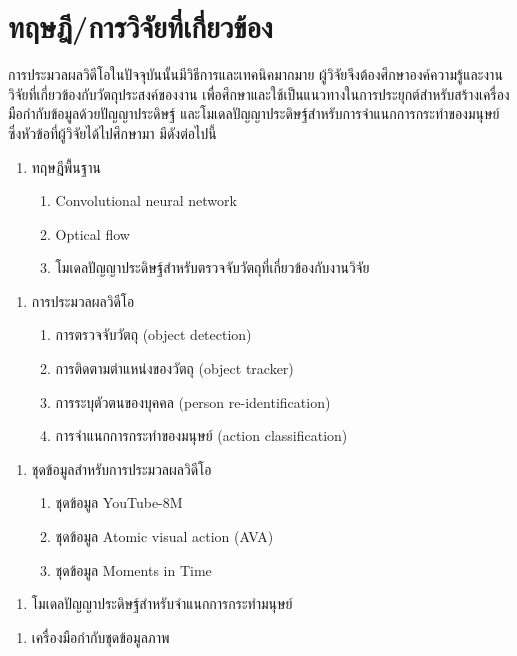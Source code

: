 \clearpage
\chapter{ทฤษฎี/การวิจัยที่เกี่ยวข้อง}
การประมวลผลวิดีโอในปัจจุบันนั้นมีวิธีการและเทคนิคมากมาย ผู้วิจัยจึงต้องศึกษาองค์ความรู้และงานวิจัยที่เกี่ยวข้องกับวัตถุประสงค์ของงาน 
เพื่อศึกษาและใช้เป็นแนวทางในการประยุกต์สำหรับสร้างเครื่องมือกำกับข้อมูลด้วยปัญญาประดิษฐ์ และโมเดลปัญญาประดิษฐ์สำหรับการจำแนกการกระทำของมนุษย์ 
ซึ่งหัวข้อที่ผู้วิจัยได้ไปศึกษามา มีดังต่อไปนี้
\begin{enumerate}[label*=2.1.]
	\setlength\itemsep{-0.25em}
	\item ทฤษฎีพื้นฐาน
	\begin{enumerate}[label*=\arabic*.]
		\item Convolutional neural network
		\item Optical flow
		\item โมเดลปัญญาประดิษฐ์สำหรับตรวจจับวัตถุที่เกี่ยวข้องกับงานวิจัย
	\end{enumerate}
\end{enumerate}
\begin{enumerate}[label*=2.2.]
	\item การประมวลผลวิดีโอ
	\begin{enumerate}[label*=\arabic*.]
		\item การตรวจจับวัตถุ (object detection)
		\item การติดตามตำแหน่งของวัตถุ (object tracker)
		\item การระบุตัวตนของบุคคล (person re-identification)
		\item การจำแนกการกระทำของมนุษย์ (action classification)
	\end{enumerate}
\end{enumerate}
\begin{enumerate}[label*=2.3.]
	\item ชุดข้อมูลสำหรับการประมวลผลวิดีโอ
	\begin{enumerate}[label*=\arabic*.]
		\item ชุดข้อมูล YouTube-8M
		\item ชุดข้อมูล Atomic visual action (AVA)
		\item ชุดข้อมูล Moments in Time
	\end{enumerate}
\end{enumerate}
\begin{enumerate}[label*=2.4.]
	\item โมเดลปัญญาประดิษฐ์สำหรับจำแนกการกระทำมนุษย์
\end{enumerate}
\begin{enumerate}[label*=2.5.]
	\item เครื่องมือกำกับชุดข้อมูลภาพ
\end{enumerate}
\clearpage

